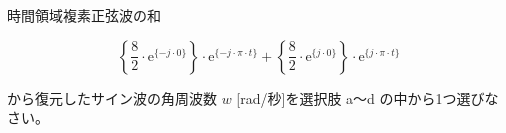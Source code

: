 時間領域複素正弦波の和

\[
\left \{ \frac{8}{2} \cdot \textrm{e}^{\{-j \cdot 0 \}} \right \} \cdot \textrm{e}^{\{-j \cdot \pi \cdot t \}} +  
\left \{ \frac{8}{2} \cdot \textrm{e}^{\{ j \cdot 0 \}} \right \} \cdot \textrm{e}^{\{ j \cdot \pi \cdot t \}}
\]

\bigskip
\noindent から復元したサイン波の角周波数 $w$ [rad/秒]を選択肢 a〜d の中から1つ選びなさい。
